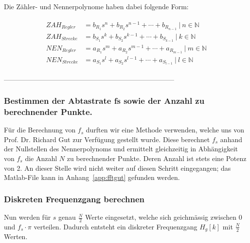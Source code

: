 Die Z\"ahler- und Nennerpolynome haben dabei folgende Form:

\begin{gather*}
    \begin{split}
        ZAH_{Regler}  & = b_{R_1} s^n  + b_{R_2} s^{n-1}  + \dotsb  + b_{R_{n-1}}     ~\biggr \rvert~ n \in  \mathbb{N} \\
        ZAH_{Strecke} & = b_{S_1} s^k  + b_{S_2} s^{k-1}  + \dotsb  + b_{S_{k-1}}     ~\biggr \rvert~ k \in  \mathbb{N}  \\
        NEN_{Regler}  & = a_{R_1} s^m  + a_{R_2} s^{m-1}  + \dotsb  + a_{R_{m-1}}     ~\biggr \rvert~ m \in  \mathbb{N}  \\
        NEN_{Strecke} & = a_{S_1} s^l  + a_{S_2} s^{l-1}  + \dotsb  + a_{S_{l-1}}     ~\biggr \rvert~ l \in  \mathbb{N}
    \end{split}
\end{gather*}


 --------------------------------------------------------------------------- %
\subsubsection*{Bestimmen der Abtastrate fs sowie der Anzahl zu berechnender Punkte.}

F\"ur die Berechnung von $f_s$ durften  wir eine Methode verwenden, welche uns
von  Prof. Dr. Richard Gut  zur  Verf\"ugung  gestellt wurde. Diese  berechnet
$f_s$ anhand der Nullstellen des  Nennerpolynoms und ermittelt gleichzeitig in
Abh\"angigkeit von $f_s$  die Anzahl $N$ zu  berechnender Punkte. Deren Anzahl
ist stets  eine Potenz von  2. An dieser Stelle  wird nicht weiter  auf diesen
Schritt eingegangen; das Matlab-File  kann in Anhang~\ref{app:fftgut} gefunden
werden.


\subsubsection*{Diskreten Frequenzgang berechnen}

Nun  werden  f\"ur  $s$  genau $\frac{N}{2}$  Werte  eingesetzt,  welche  sich
geichm\"assig zwischen 0  und $f_s \cdot \pi$  verteilen. Dadurch entsteht ein
diskreter Frequenzgang $H_g[k]$ mit $\frac{N}{2}$ Werten.

